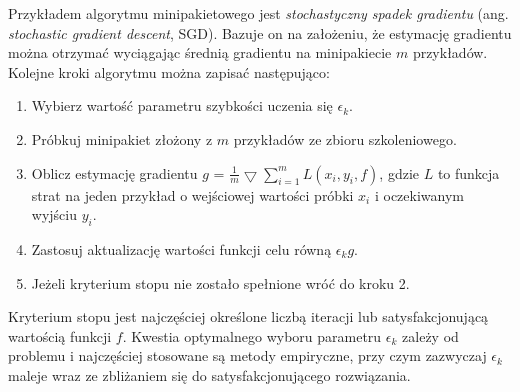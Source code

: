 Przykładem algorytmu minipakietowego jest \textit{stochastyczny spadek gradientu} (ang. \textit{stochastic gradient descent}, SGD). Bazuje on na założeniu, że estymację gradientu można otrzymać wyciągając średnią gradientu na minipakiecie $m$ przykładów. Kolejne kroki algorytmu można zapisać następująco:
\begin{enumerate}
	\item Wybierz wartość parametru szybkości uczenia się $\epsilon_k$.
	\item Próbkuj minipakiet złożony z $m$ przykładów ze zbioru szkoleniowego.
	\item Oblicz estymację gradientu $g$ = $\frac{1}{m}\bigtriangledown \sum_{i=1}^{m}L(x_i, y_i, f)$, gdzie $L$ to funkcja strat na jeden przykład o wejściowej wartości próbki $x_i$ i oczekiwanym wyjściu $y_i$.
	\item Zastosuj aktualizację wartości funkcji celu równą $\epsilon_k g$.
	\item Jeżeli kryterium stopu nie zostało spełnione wróć do kroku 2. 
\end{enumerate}

Kryterium stopu jest najczęściej określone liczbą iteracji lub satysfakcjonującą wartością funkcji $f$. Kwestia optymalnego wyboru parametru $\epsilon_k$ zależy od problemu i najczęściej stosowane są metody empiryczne, przy czym zazwyczaj $\epsilon_k$ maleje wraz ze zbliżaniem się do satysfakcjonującego rozwiązania.

